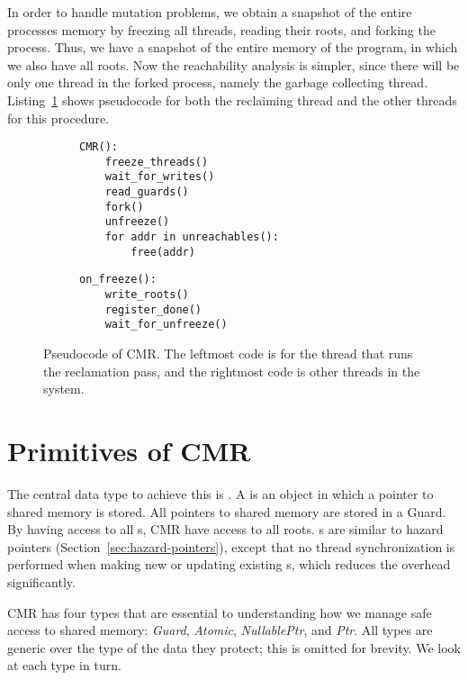 In order to handle mutation problems, we obtain a snapshot of the entire processes memory by
freezing all threads, reading their roots, and forking the process. Thus, we have a snapshot of
the entire memory of the program, in which we also have all roots. Now the reachability analysis is
simpler, since there will be only one thread in the forked process, namely the garbage collecting
thread. Listing~\ref{lst:cmr} shows pseudocode for both the reclaiming thread and the other threads
for this procedure.

\begin{figure}[ht]
  \begin{subfigure}{0.45\textwidth}
    \begin{lstlisting}
CMR():
    freeze_threads()
    wait_for_writes()
    read_guards()
    fork()
    unfreeze()
    for addr in unreachables():
        free(addr)
    \end{lstlisting}
  \end{subfigure}
  \hfill
  \begin{subfigure}{0.45\textwidth}
    \begin{lstlisting}
on_freeze():
    write_roots()
    register_done()
    wait_for_unfreeze()
    \end{lstlisting}
  \end{subfigure}
  \caption{Pseudocode of CMR\@. The leftmost code is for the thread that runs the reclamation pass,
  and the rightmost code is other threads in the system.\label{lst:cmr}}
\end{figure}



\section{Primitives of CMR\label{sec:cmr-primitives}}

The central data type to achieve this is . A  is an object in which a
pointer to shared memory is stored. All pointers to shared memory are stored in a Guard. By having
access to all s, CMR have access to all roots. s are similar to hazard
pointers (Section~\ref{sec:hazard-pointers}), except that no thread synchronization is performed
when making new or updating existing s, which reduces the overhead significantly.

CMR has four types that are essential to understanding how we manage safe access to shared memory:
\emph{Guard}, \emph{Atomic}, \emph{NullablePtr}, and \emph{Ptr}. All types are generic over the
type of the data they protect; this is omitted for brevity. We look at each type in turn.


